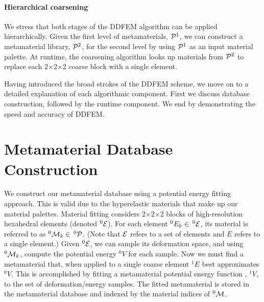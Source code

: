 \paragraph{Hierarchical coarsening}
We stress that both stages of the DDFEM algorithm can be applied hierarchically. Given the first level of metamaterials, $\mathcal{P}^1$, we can construct a metamaterial library, $\mathcal{P}^2$, for the second level by using $\mathcal{P}^1$ as an input material palette. At runtime, the coarsening algorithm looks up materials from $\mathcal{P}^2$ to replace each 2$\times$2$\times$2 coarse block with a single element.

Having introduced the broad strokes of the DDFEM scheme, we move on to a detailed explanation of each algorithmic component. First we discuss database construction, followed by the runtime component. We end by demonstrating the speed and accuracy of DDFEM.
\section{Metamaterial Database Construction}
\label{sec:database}
We construct our metamaterial database using a potential energy fitting approach. This is valid due to the hyperelastic materials that make up our material palettes. Material fitting considers 2$\times$2$\times$2 blocks of high-resolution hexahedral elements (denoted $^0\mathcal{E}$). For each element $^0E_k\in \, ^0\mathcal{E}$, its material is referred to as $^0\mathcal{M}_k\in \, ^0\mathcal{P}$. (Note that $\mathcal{E}$ refers to a set of elements and $E$ refers to a single element.) Given $^0\mathcal{E}$, we can sample its deformation space, and using $^0\mathcal{M}_k$, compute the potential energy $^0V$ for each sample.  Now we must find a metamaterial that, when applied to a single coarse element $^1\mathit{E}$ best approximates $^0V$.  This is accomplished by fitting a metamaterial potential energy function , $^1V$, to the set of deformation/energy samples. The fitted metamaterial is stored in the metamaterial database and indexed by the material indices of $^0\mathcal{M}$.

